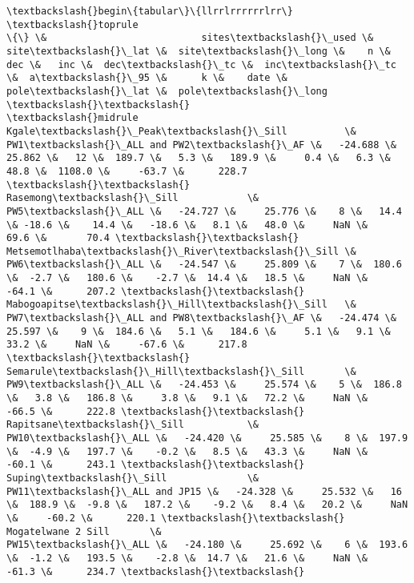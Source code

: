 \documentclass{article}
\begin{document}
    \begin{Verbatim}[commandchars=\\\{\}]
\textbackslash{}begin\{tabular\}\{llrrlrrrrrrlrr\}
\textbackslash{}toprule
\{\} \&                           sites\textbackslash{}\_used \&  site\textbackslash{}\_lat \&  site\textbackslash{}\_long \&    n \&    dec \&   inc \&  dec\textbackslash{}\_tc \&  inc\textbackslash{}\_tc \&  a\textbackslash{}\_95 \&      k \&    date \&  pole\textbackslash{}\_lat \&  pole\textbackslash{}\_long \textbackslash{}\textbackslash{}
\textbackslash{}midrule
Kgale\textbackslash{}\_Peak\textbackslash{}\_Sill          \&                   PW1\textbackslash{}\_ALL and PW2\textbackslash{}\_AF \&   -24.688 \&     25.862 \&   12 \&  189.7 \&   5.3 \&   189.9 \&     0.4 \&   6.3 \&   48.8 \&  1108.0 \&     -63.7 \&      228.7 \textbackslash{}\textbackslash{}
Rasemong\textbackslash{}\_Sill            \&                              PW5\textbackslash{}\_ALL \&   -24.727 \&     25.776 \&    8 \&   14.4 \& -18.6 \&    14.4 \&   -18.6 \&   8.1 \&   48.0 \&     NaN \&      69.6 \&       70.4 \textbackslash{}\textbackslash{}
Metsemotlhaba\textbackslash{}\_River\textbackslash{}\_Sill \&                              PW6\textbackslash{}\_ALL \&   -24.547 \&     25.809 \&    7 \&  180.6 \&  -2.7 \&   180.6 \&    -2.7 \&  14.4 \&   18.5 \&     NaN \&     -64.1 \&      207.2 \textbackslash{}\textbackslash{}
Mabogoapitse\textbackslash{}\_Hill\textbackslash{}\_Sill   \&                   PW7\textbackslash{}\_ALL and PW8\textbackslash{}\_AF \&   -24.474 \&     25.597 \&    9 \&  184.6 \&   5.1 \&   184.6 \&     5.1 \&   9.1 \&   33.2 \&     NaN \&     -67.6 \&      217.8 \textbackslash{}\textbackslash{}
Semarule\textbackslash{}\_Hill\textbackslash{}\_Sill       \&                              PW9\textbackslash{}\_ALL \&   -24.453 \&     25.574 \&    5 \&  186.8 \&   3.8 \&   186.8 \&     3.8 \&   9.1 \&   72.2 \&     NaN \&     -66.5 \&      222.8 \textbackslash{}\textbackslash{}
Rapitsane\textbackslash{}\_Sill           \&                             PW10\textbackslash{}\_ALL \&   -24.420 \&     25.585 \&    8 \&  197.9 \&  -4.9 \&   197.7 \&    -0.2 \&   8.5 \&   43.3 \&     NaN \&     -60.1 \&      243.1 \textbackslash{}\textbackslash{}
Suping\textbackslash{}\_Sill              \&                    PW11\textbackslash{}\_ALL and JP15 \&   -24.328 \&     25.532 \&   16 \&  188.9 \&  -9.8 \&   187.2 \&    -9.2 \&   8.4 \&   20.2 \&     NaN \&     -60.2 \&      220.1 \textbackslash{}\textbackslash{}
Mogatelwane 2 Sill       \&                             PW15\textbackslash{}\_ALL \&   -24.180 \&     25.692 \&    6 \&  193.6 \&  -1.2 \&   193.5 \&    -2.8 \&  14.7 \&   21.6 \&     NaN \&     -61.3 \&      234.7 \textbackslash{}\textbackslash{}

\end{Verbatim}
\end{document}
